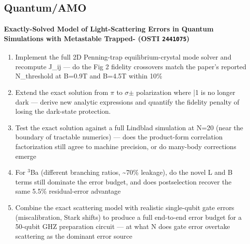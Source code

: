 \documentclass[11pt]{article}
\begin{document}
\subsection*{Quantum/AMO}
\paragraph{Exactly-Solved Model of Light-Scattering Errors in Quantum Simulations with Metastable Trapped- \textnormal{\small(OSTI \texttt{2441075})}}
\begin{enumerate}[leftmargin=1.6em,itemsep=0.2em,topsep=0.2em,label=Q\arabic*.]
\item Implement the full 2D Penning-trap equilibrium-crystal mode solver and recompute J\_ij --- do the Fig 2 fidelity crossovers match the paper's reported N\_threshold at B=0.9T and B=4.5T within 10\%
\item Extend the exact solution from $\pi$ to $\sigma$$\pm$ polarization where |1 is no longer dark --- derive new analytic expressions and quantify the fidelity penalty of losing the dark-state protection.
\item Test the exact solution against a full Lindblad simulation at N=20 (near the boundary of tractable numerics) --- does the product-form correlation factorization still agree to machine precision, or do many-body corrections emerge
\item For $^3$Ba (different branching ratios, \textasciitilde{}70\% leakage), do the novel L and B terms still dominate the error budget, and does postselection recover the same 5.5\% residual-error advantage
\item Combine the exact scattering model with realistic single-qubit gate errors (miscalibration, Stark shifts) to produce a full end-to-end error budget for a 50-qubit GHZ preparation circuit --- at what N does gate error overtake scattering as the dominant error source
\end{enumerate}
\end{document}
